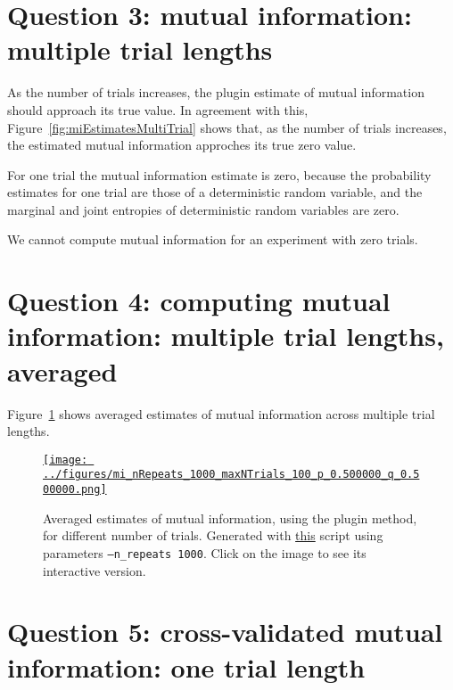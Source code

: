 \documentclass[12pt]{article}
\begin{document}
\section*{Question 3: mutual information: multiple trial lengths}

As the number of trials increases, the plugin estimate of mutual information
should approach its true value. In agreement with this,
Figure~\ref{fig:miEstimatesMultiTrial} shows that, as the number of trials
increases, the estimated mutual information approches its true zero value.

For one trial the mutual information estimate is zero, because the probability
estimates for one trial are those of a deterministic random variable, and the
marginal and joint entropies of deterministic random variables are zero.

We cannot compute mutual information for an experiment with  zero trials.

\section*{Question 4: computing mutual information: multiple trial lengths, averaged}

Figure~\ref{fig:miEstimatesMultiTrialAveraged} shows averaged estimates of
mutual information across multiple trial lengths.

\begin{figure}[H]
    \begin{center}
        \href{https://www.gatsby.ucl.ac.uk/~rapela/neuroinformatics/2023/ws8/figures/mi_nRepeats_1000_maxNTrials_100_p_0.500000_q_0.500000.html}{\texttt{[image: ../figures/mi\_nRepeats\_1000\_maxNTrials\_100\_p\_0.500000\_q\_0.500000.png]}}

        \caption{Averaged estimates of mutual information, using the plugin method, for different number of trials.
        Generated with
        \href{https://github.com/joacorapela/neuroinformatics23/blob/master/worksheets/ws8/mySolution/code/scripts/doEstimateMI_multiTrials.py}{this}
        script using parameters \texttt{--n\_repeats 1000}. Click on the image to see its
        interactive version.}

        \label{fig:miEstimatesMultiTrialAveraged}
    \end{center}
\end{figure}

\section*{Question 5: cross-validated mutual information: one trial length}
\end{document}
